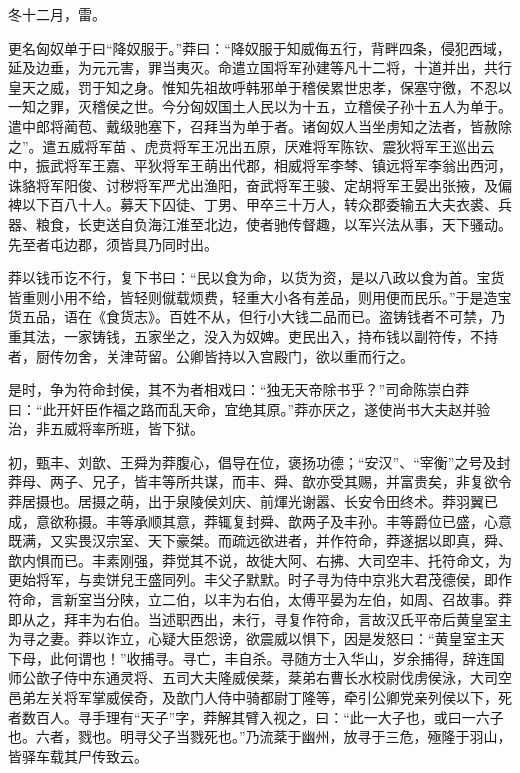 \documentclass[12pt,UTF8]{ctexbook}
\begin{document}
冬十二月，雷。



更名匈奴单于曰“降奴服于。”莽曰：“降奴服于知威侮五行，背畔四条，侵犯西域，延及边垂，为元元害，罪当夷灭。命遣立国将军孙建等凡十二将，十道并出，共行皇天之威，罚于知之身。惟知先祖故呼韩邪单于稽侯累世忠孝，保塞守徼，不忍以一知之罪，灭稽侯之世。今分匈奴国土人民以为十五，立稽侯子孙十五人为单于。遣中郎将蔺苞、戴级驰塞下，召拜当为单于者。诸匈奴人当坐虏知之法者，皆赦除之”。遣五威将军苗、虎贲将军王况出五原，厌难将军陈钦、震狄将军王巡出云中，振武将军王嘉、平狄将军王萌出代郡，相威将军李棽、镇远将军李翁出西河，诛貉将军阳俊、讨秽将军严尤出渔阳，奋武将军王骏、定胡将军王晏出张掖，及偏裨以下百八十人。募天下囚徒、丁男、甲卒三十万人，转众郡委输五大夫衣裘、兵器、粮食，长吏送自负海江淮至北边，使者驰传督趣，以军兴法从事，天下骚动。先至者屯边郡，须皆具乃同时出。



莽以钱币讫不行，复下书曰：“民以食为命，以货为资，是以八政以食为首。宝货皆重则小用不给，皆轻则僦载烦费，轻重大小各有差品，则用便而民乐。”于是造宝货五品，语在《食货志》。百姓不从，但行小大钱二品而已。盗铸钱者不可禁，乃重其法，一家铸钱，五家坐之，没入为奴婢。吏民出入，持布钱以副符传，不持者，厨传勿舍，关津苛留。公卿皆持以入宫殿门，欲以重而行之。



是时，争为符命封侯，其不为者相戏曰：“独无天帝除书乎？”司命陈崇白莽曰：“此开奸臣作福之路而乱天命，宜绝其原。”莽亦厌之，遂使尚书大夫赵并验治，非五威将率所班，皆下狱。



初，甄丰、刘歆、王舜为莽腹心，倡导在位，褒扬功德；“安汉”、“宰衡”之号及封莽母、两子、兄子，皆丰等所共谋，而丰、舜、歆亦受其赐，并富贵矣，非复欲令莽居摄也。居摄之萌，出于泉陵侯刘庆、前煇光谢嚣、长安令田终术。莽羽翼已成，意欲称摄。丰等承顺其意，莽辄复封舜、歆两子及丰孙。丰等爵位已盛，心意既满，又实畏汉宗室、天下豪桀。而疏远欲进者，并作符命，莽遂据以即真，舜、歆内惧而已。丰素刚强，莽觉其不说，故徙大阿、右拂、大司空丰、托符命文，为更始将军，与卖饼兒王盛同列。丰父子默默。时子寻为侍中京兆大君茂德侯，即作符命，言新室当分陕，立二伯，以丰为右伯，太傅平晏为左伯，如周、召故事。莽即从之，拜丰为右伯。当述职西出，未行，寻复作符命，言故汉氏平帝后黄皇室主为寻之妻。莽以诈立，心疑大臣怨谤，欲震威以惧下，因是发怒曰：“黄皇室主天下母，此何谓也！”收捕寻。寻亡，丰自杀。寻随方士入华山，岁余捕得，辞连国师公歆子侍中东通灵将、五司大夫隆威侯棻，棻弟右曹长水校尉伐虏侯泳，大司空邑弟左关将军掌威侯奇，及歆门人侍中骑都尉丁隆等，牵引公卿党亲列侯以下，死者数百人。寻手理有“天子”字，莽解其臂入视之，曰：“此一大子也，或曰一六子也。六者，戮也。明寻父子当戮死也。”乃流棻于幽州，放寻于三危，殛隆于羽山，皆驿车载其尸传致云。
\end{document}
